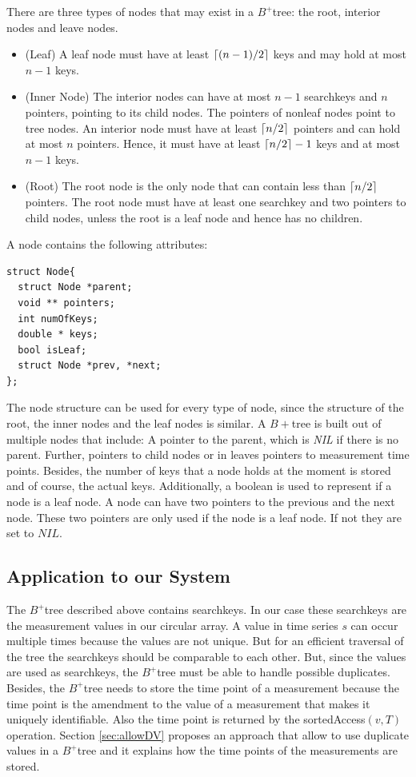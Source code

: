 \documentclass[abstracton,12pt,oneside]{scrreprt}
\DeclarePairedDelimiter\ceil{\lceil}{\rceil}
\begin{document}
There are three types of nodes that may exist in a $B^+$tree: the root, interior nodes and leave nodes.
\begin{itemize}
	\item (Leaf) A leaf node must have at least $\ceil{(n-1)/2}$ keys and may hold at most $n-1$ keys.
	\item (Inner Node) The interior nodes can have at most $n-1$ searchkeys and $n$ pointers, pointing to its child nodes. The pointers of nonleaf nodes point to tree nodes. An interior node must have at least $\ceil{n/2}$ pointers and can hold at most $n$ pointers. Hence, it must have at least $\ceil{n/2}-1$ keys and at most $n-1$ keys.
	\item (Root) The root node is the only node that can contain less than $\ceil{n/2}$ pointers. The root node must have at least one searchkey and two pointers to child nodes, unless the root is a leaf node and hence has no children.
\end{itemize}



A node contains the following attributes: 
\lstset{language=C}
\begin{lstlisting}
struct Node{
  struct Node *parent;
  void ** pointers;
  int numOfKeys;
  double * keys;
  bool isLeaf;
  struct Node *prev, *next;
};
\end{lstlisting}
\BlankLine
The node structure can be used for every type of node, since the structure of the root, the inner nodes and the leaf nodes is similar. A $B+$tree is built out of multiple nodes that include: A pointer to the parent, which is \emph{NIL} if there is no parent. Further, pointers to child nodes or in leaves pointers to measurement time points. Besides, the number of keys that a node holds at the moment is stored and of course, the actual keys. Additionally, a boolean is used to represent if a node is a leaf node. A node can have two pointers to the previous and the next node. These two pointers are only used if the node is a leaf node. If not they are set to $NIL$.


\subsection{Application to our System}
The $B^+$tree described above contains searchkeys. In our case these searchkeys are the measurement values in our circular array. A value in time series $s$ can occur multiple times because the values are not unique. But for an efficient traversal of the tree the searchkeys should be comparable to each other. But, since the values are used as searchkeys, the $B^+$tree must be able to handle possible duplicates. Besides, the $B^+$tree needs to store the time point of a measurement because the time point is the amendment to the value of a measurement that makes it uniquely identifiable. Also the time point is returned by the sortedAccess$(v,T)$ operation. Section \ref{sec:allowDV} proposes an approach that allow to use duplicate values in a $B^+$tree and it explains how the time points of the measurements are stored. 
\end{document}
